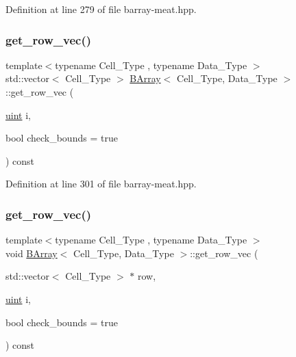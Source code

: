 Definition at line 279 of file barray-\/meat.\+hpp.

\mbox{\label{class_b_array_a2be45b966d99e2bdd3f9994ed70ff145}} 
\subsubsection{\texorpdfstring{get\+\_\+row\+\_\+vec()}{get\_row\_vec()}\hspace{0.1cm}{\footnotesize\ttfamily [1/2]}}
{\footnotesize\ttfamily template$<$typename Cell\+\_\+\+Type , typename Data\+\_\+\+Type $>$ \\
std\+::vector$<$ Cell\+\_\+\+Type $>$ \hyperlink{class_b_array}{B\+Array}$<$ Cell\+\_\+\+Type, Data\+\_\+\+Type $>$\+::get\+\_\+row\+\_\+vec (\begin{DoxyParamCaption}\item[{\hyperlink{typedefs_8hpp_a91ad9478d81a7aaf2593e8d9c3d06a14}{uint}}]{i,  }\item[{bool}]{check\+\_\+bounds = {\ttfamily true} }\end{DoxyParamCaption}) const\hspace{0.3cm}{\ttfamily [inline]}}



Definition at line 301 of file barray-\/meat.\+hpp.

\mbox{\label{class_b_array_a7b098128c6debca4409d15d1906bd2be}} 
\subsubsection{\texorpdfstring{get\+\_\+row\+\_\+vec()}{get\_row\_vec()}\hspace{0.1cm}{\footnotesize\ttfamily [2/2]}}
{\footnotesize\ttfamily template$<$typename Cell\+\_\+\+Type , typename Data\+\_\+\+Type $>$ \\
void \hyperlink{class_b_array}{B\+Array}$<$ Cell\+\_\+\+Type, Data\+\_\+\+Type $>$\+::get\+\_\+row\+\_\+vec (\begin{DoxyParamCaption}\item[{std\+::vector$<$ Cell\+\_\+\+Type $>$ $\ast$}]{row,  }\item[{\hyperlink{typedefs_8hpp_a91ad9478d81a7aaf2593e8d9c3d06a14}{uint}}]{i,  }\item[{bool}]{check\+\_\+bounds = {\ttfamily true} }\end{DoxyParamCaption}) const\hspace{0.3cm}{\ttfamily [inline]}}



